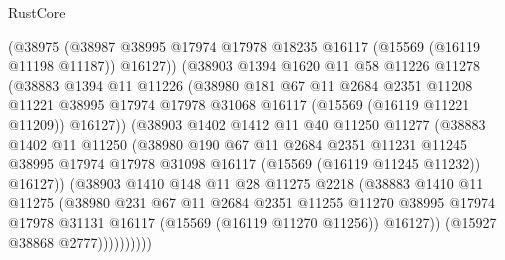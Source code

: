 \begin{lexlean}{RustCore}
\begin{coremodule}
                (@38975
                  (@38987
                    @38995
                    @17974
                    @17978
                    @18235
                    @16117
                    (@15569 (@16119 @11198 @11187))
                    @16127))
                (@38903
                  @1394
                  @1620
                  @11
                  @58
                  @11226
                  @11278
                  (@38883
                    @1394
                    @11
                    @11226
                    (@38980
                      @181
                      @67
                      @11
                      @2684
                      @2351
                      @11208
                      @11221
                      @38995
                      @17974
                      @17978
                      @31068
                      @16117
                      (@15569 (@16119 @11221 @11209))
                      @16127))
                  (@38903
                    @1402
                    @1412
                    @11
                    @40
                    @11250
                    @11277
                    (@38883
                      @1402
                      @11
                      @11250
                      (@38980
                        @190
                        @67
                        @11
                        @2684
                        @2351
                        @11231
                        @11245
                        @38995
                        @17974
                        @17978
                        @31098
                        @16117
                        (@15569 (@16119 @11245 @11232))
                        @16127))
                    (@38903
                      @1410
                      @148
                      @11
                      @28
                      @11275
                      @2218
                      (@38883
                        @1410
                        @11
                        @11275
                        (@38980
                          @231
                          @67
                          @11
                          @2684
                          @2351
                          @11255
                          @11270
                          @38995
                          @17974
                          @17978
                          @31131
                          @16117
                          (@15569 (@16119 @11270 @11256))
                          @16127))
                      (@15927 @38868 @2777))))))))))

\end{coremodule}
\end{lexlean}
